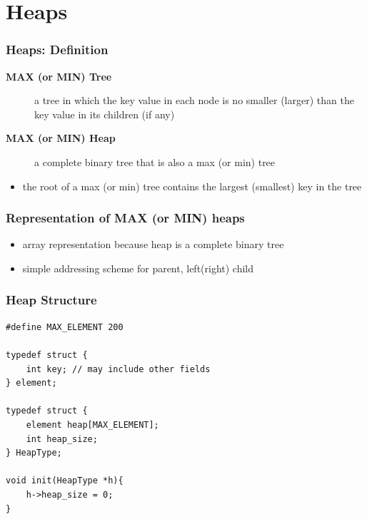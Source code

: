 \documentclass[newPxFont,sthlmFooter,nooffset]{beamer}
\begin{document}
\section{Heaps}
\begin{frame}[t]
  \frametitle{Heaps: Definition}
  \begin{description}
  \item[\textbf{MAX (or MIN) Tree}] a tree in which the key value in each node is no smaller (larger) than the key value in its children (if any)
  \item [\textbf{MAX (or MIN) Heap}] a complete binary tree that is also a max (or min) tree
  \end{description}
  \begin{itemize}
  \item the root of a max (or min) tree contains the largest (smallest) key in the tree
  \end{itemize}
\end{frame}


\begin{frame}[t]
  \frametitle{Representation of MAX (or MIN) heaps}
  \begin{itemize}
  \item array representation because heap is a complete binary tree

  \item simple addressing scheme for parent, left(right) child
  \end{itemize}

\end{frame}


\begin{frame}[t, fragile]
  \frametitle{Heap Structure}
\label{lst:heapstruct}
  \begin{lstlisting}
#define MAX_ELEMENT 200

typedef struct {
	int key; // may include other fields
} element;

typedef struct {
	element heap[MAX_ELEMENT];
	int heap_size;
} HeapType;

void init(HeapType *h){
	h->heap_size = 0;
}
  \end{lstlisting}
\end{frame}
\end{document}
